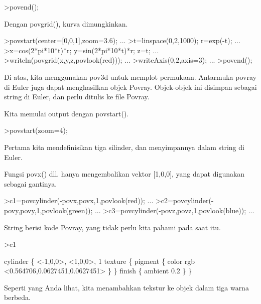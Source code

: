 \documentclass{article}
\begin{document}
\begin{eulernotebook}
\begin{eulercomment}
\begin{eulercomment}
\begin{eulerprompt}
>povend();
\end{eulerprompt}
\begin{eulercomment}
Dengan povgrid(), kurva dimungkinkan.
\end{eulercomment}
\begin{eulerprompt}
>povstart(center=[0,0,1],zoom=3.6); ...
>t=linspace(0,2,1000); r=exp(-t); ...
>x=cos(2*pi*10*t)*r; y=sin(2*pi*10*t)*r; z=t; ...
>writeln(povgrid(x,y,z,povlook(red))); ...
>writeAxis(0,2,axis=3); ...
>povend();
\end{eulerprompt}
\begin{eulercomment}
Di atas, kita menggunakan pov3d untuk memplot permukaan. Antarmuka
povray di Euler juga dapat menghasilkan objek Povray. Objek-objek ini
disimpan sebagai string di Euler, dan perlu ditulis ke file Povray.

Kita memulai output dengan povstart().
\end{eulercomment}
\begin{eulerprompt}
>povstart(zoom=4);
\end{eulerprompt}
\begin{eulercomment}
Pertama kita mendefinisikan tiga silinder, dan menyimpannya dalam
string di Euler.

Fungsi povx() dll. hanya mengembalikan vektor [1,0,0], yang dapat
digunakan sebagai gantinya.
\end{eulercomment}
\begin{eulerprompt}
>c1=povcylinder(-povx,povx,1,povlook(red)); ...
>c2=povcylinder(-povy,povy,1,povlook(green)); ...
>c3=povcylinder(-povz,povz,1,povlook(blue)); ...
\end{eulerprompt}
\begin{eulercomment}
String berisi kode Povray, yang tidak perlu kita pahami pada saat itu.
\end{eulercomment}
\begin{eulerprompt}
>c1
\end{eulerprompt}
\begin{euleroutput}
  cylinder \{ <-1,0,0>, <1,0,0>, 1
   texture \{ pigment \{ color rgb <0.564706,0.0627451,0.0627451> \}  \} 
   finish \{ ambient 0.2 \} 
   \}
\end{euleroutput}
\begin{eulercomment}
Seperti yang Anda lihat, kita menambahkan tekstur ke objek dalam tiga
warna berbeda.


\end{eulercomment}
\end{eulercomment}
\end{eulercomment}
\end{eulernotebook}
\end{document}
